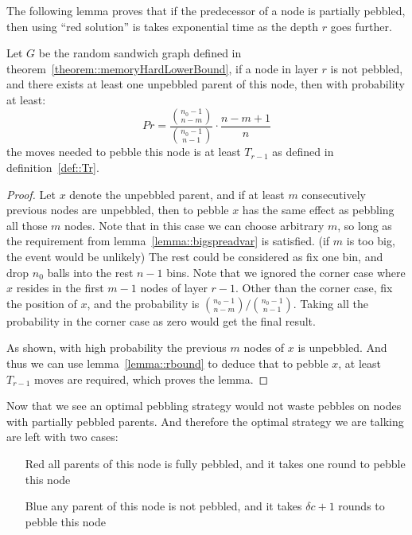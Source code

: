 The following lemma proves that if the predecessor of a node is partially pebbled, then using ``red solution'' is takes exponential
time as the depth $r$ goes further.

\begin{lemma}\label{lemma::quality}
  Let $G$ be the random sandwich graph defined in theorem~\ref{theorem::memoryHardLowerBound}, if a node in layer $r$
  is not pebbled, and there exists at least one unpebbled parent of this node, then with probability at least:
  \begin{equation}
    Pr = \frac{\binom{n_0 - 1}{n - m}}{\binom{n_0 - 1}{n - 1}} \cdot \frac{n - m + 1}{n}
  \end{equation}
  the moves needed to pebble this node is at least $T_{r - 1}$ as defined in definition~\ref{def::Tr}.
\end{lemma}

\begin{proof}
  Let $x$ denote the unpebbled parent, and if at least $m$ consecutively previous nodes are unpebbled, then to pebble $x$
  has the same effect as pebbling all those $m$ nodes. Note that in this case we can choose arbitrary $m$, so long as the
  requirement from lemma~\ref{lemma::bigspreadvar} is satisfied. (if $m$ is too big, the event would be unlikely) The rest
  could be considered as fix one bin, and drop $n_0$ balls into the rest $n - 1$ bins. Note that we ignored the corner
  case where $x$ resides in the first $m - 1$ nodes of layer $r - 1$. Other than the corner case, fix the position of $x$,
  and the probability is $\binom{n_0 - 1}{n - m}/\binom{n_0 - 1}{n - 1}$. Taking all the probability in the corner
  case as zero would get the final result.
  
  As shown, with high probability the previous $m$ nodes of $x$ is unpebbled. And thus we can use lemma~\ref{lemma::rbound}
  to deduce that to pebble $x$, at least $T_{r - 1}$ moves are required, which proves the lemma.
\end{proof}

Now that we see an optimal pebbling strategy would not waste pebbles on nodes with partially pebbled parents. And
therefore the optimal strategy we are talking are left with two cases:

\begin{itemize}
  \item[Red] all parents of this node is fully pebbled, and it takes one round to pebble this node
  \item[Blue] any parent of this node is not pebbled, and it takes $\delta c + 1$ rounds to pebble this node
\end{itemize}

